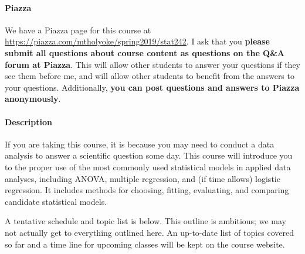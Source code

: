 \documentclass[11pt]{article}
\begin{document}
	\paragraph{Piazza}
	
	We have a Piazza page for this course at \url{https://piazza.com/mtholyoke/spring2019/stat242}.  I ask that you \textbf{please submit all questions about course content as questions on the Q{\&}A forum at Piazza}.  This will allow other students to answer your questions if they see them before me, and will allow other students to benefit from the answers to your questions.  Additionally, \textbf{you can post questions and answers to Piazza anonymously}.
	
	\paragraph{Description}
	
	If you are taking this course, it is because you may need to conduct a data analysis to answer a scientific question some day.
	This course will introduce you to the proper use of the most commonly used statistical models in applied data analyses, including ANOVA, multiple regression, and (if time allows) logistic regression.
	It includes methods for choosing, fitting, evaluating, and comparing candidate statistical models.
	
	A tentative schedule and topic list is below.  This outline is ambitious; we may not actually get to everything outlined here.  An up-to-date list of topics covered so far and a time line for upcoming classes will be kept on the course website.
	
\end{document}
